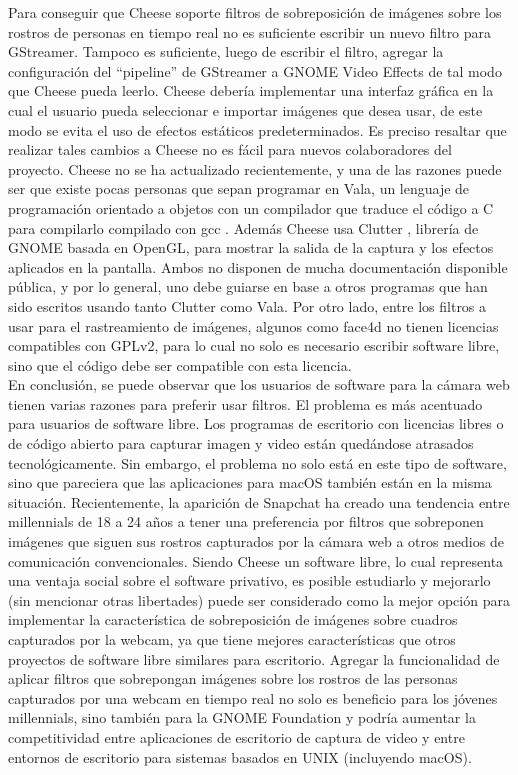 \documentclass[a4paper,openright,12pt]{report}
\begin{document}
Para conseguir que Cheese soporte filtros de sobreposición de imágenes sobre los
rostros de personas en tiempo real no es suficiente escribir un nuevo filtro
para GStreamer. Tampoco es suficiente, luego de escribir el filtro, agregar la
configuración del “pipeline” de GStreamer a GNOME Video Effects de tal modo que
Cheese pueda leerlo. Cheese debería implementar una interfaz gráfica en la cual
el usuario pueda seleccionar e importar imágenes que desea usar, de este modo
se evita el uso de efectos estáticos predeterminados. Es preciso resaltar que
realizar tales cambios a Cheese no es fácil para nuevos colaboradores del
proyecto. Cheese no se ha actualizado recientemente, y una de las razones puede
ser que existe pocas personas que sepan programar en Vala, un lenguaje de
programación orientado a objetos con un compilador que traduce el
código a C para compilarlo compilado con gcc \cite{valaOverview}. Además Cheese
usa Clutter \cite{CheeseDependencyClutter}, librería de GNOME basada en OpenGL,
para mostrar la salida de la captura y los efectos aplicados en la pantalla.
Ambos no disponen de mucha documentación disponible pública, y por lo general,
uno debe guiarse en base a otros programas que han sido escritos usando tanto
Clutter como Vala. Por otro lado, entre los filtros a usar para el rastreamiento
de imágenes, algunos como face4d no tienen licencias compatibles con GPLv2, para
lo cual no solo es necesario escribir software libre, sino que el código debe
ser compatible con esta licencia.\\

En conclusión, se puede observar que los usuarios de software para la cámara web
tienen varias razones para preferir usar filtros. El problema es más acentuado para
usuarios de software libre. Los programas de escritorio con licencias libres o
de código abierto para capturar imagen y video están quedándose atrasados
tecnológicamente. Sin embargo, el problema no solo está en este tipo de software,
sino que pareciera que las aplicaciones para macOS también están en la misma
situación. Recientemente, la aparición de Snapchat ha creado una tendencia entre
millennials de 18 a 24 años a tener una preferencia por filtros que sobreponen
imágenes que siguen sus rostros capturados por la cámara web a otros medios
de comunicación convencionales. Siendo Cheese un software libre, lo cual
representa una ventaja social sobre el software privativo, es posible estudiarlo
y mejorarlo (sin mencionar otras libertades) puede ser considerado como la mejor
opción para implementar la característica de sobreposición de imágenes sobre
cuadros capturados por la webcam, ya que tiene mejores características que otros
proyectos de software libre similares para escritorio. Agregar la funcionalidad
de aplicar filtros que sobrepongan imágenes sobre los rostros de las personas
capturados por una webcam en tiempo real no solo es beneficio para los jóvenes
millennials, sino también para la GNOME Foundation y podría aumentar la
competitividad entre aplicaciones de escritorio de captura de video y entre
entornos de escritorio para sistemas basados en UNIX (incluyendo macOS).
\end{document}
